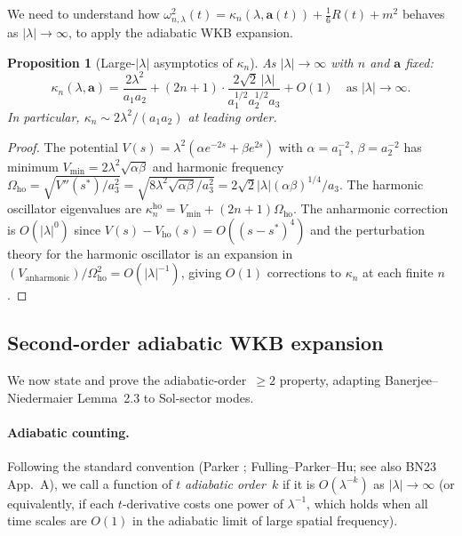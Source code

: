 \documentclass[11pt,a4paper]{article}
\newtheorem{proposition}[theorem]{Proposition}
\theoremstyle{definition}
\begin{document}
We need to understand how $\omega_{n,\lambda}^2(t) = \kappa_n(\lambda,\mathbf{a}(t))
+ \tfrac{1}{6}R(t) + m^2$ behaves as $|\lambda| \to \infty$, to apply the
adiabatic WKB expansion.

\begin{proposition}[Large-$|\lambda|$ asymptotics of $\kappa_n$]\label{prop:kappa_large_lam}
As $|\lambda| \to \infty$ with $n$ and $\mathbf{a}$ fixed:
\begin{equation}\label{eq:kappa_large_lam}
  \kappa_n(\lambda, \mathbf{a}) = \frac{2\lambda^2}{a_1 a_2} + (2n+1)\cdot
  \frac{2\sqrt{2}\,|\lambda|}{a_1^{1/2}a_2^{1/2}a_3} + O(1) \quad \text{as } |\lambda| \to \infty.
\end{equation}
In particular, $\kappa_n \sim 2\lambda^2/(a_1 a_2)$ at leading order.
\end{proposition}

\begin{proof}
The potential $V(s) = \lambda^2(\alpha e^{-2s} + \beta e^{2s})$ with $\alpha = a_1^{-2}$,
$\beta = a_2^{-2}$ has minimum $V_{\min} = 2\lambda^2\sqrt{\alpha\beta}$ and
harmonic frequency $\Omega_{\mathrm{ho}} = \sqrt{V''(s^*)/a_3^2}
= \sqrt{8\lambda^2\sqrt{\alpha\beta}/a_3^2} = 2\sqrt{2}|\lambda|(\alpha\beta)^{1/4}/a_3$.
The harmonic oscillator eigenvalues are $\kappa_n^{\mathrm{ho}} = V_{\min} + (2n+1)\Omega_{\mathrm{ho}}$.
The anharmonic correction is $O(|\lambda|^0)$ since $V(s) - V_{\mathrm{ho}}(s) = O((s-s^*)^4)$
and the perturbation theory for the harmonic oscillator is an expansion in
$(V_{\mathrm{anharmonic}}) / \Omega_{\mathrm{ho}}^2 = O(|\lambda|^{-1})$, giving $O(1)$ corrections
to $\kappa_n$ at each finite $n$.
\end{proof}

\subsection{Second-order adiabatic WKB expansion}

We now state and prove the adiabatic-order~$\geq 2$ property, adapting
Banerjee--Niedermaier \cite{BN23} Lemma~2.3 to Sol-sector modes.

\paragraph{Adiabatic counting.}
Following the standard convention (Parker \cite{Par69}; Fulling--Parker--Hu;
see also BN23 App.~A), we call a function of $t$ \emph{adiabatic order~$k$}
if it is $O(\lambda^{-k})$ as $|\lambda| \to \infty$ (or equivalently, if each
$t$-derivative costs one power of $\lambda^{-1}$, which holds when all time scales
are $O(1)$ in the adiabatic limit of large spatial frequency).
\end{document}
